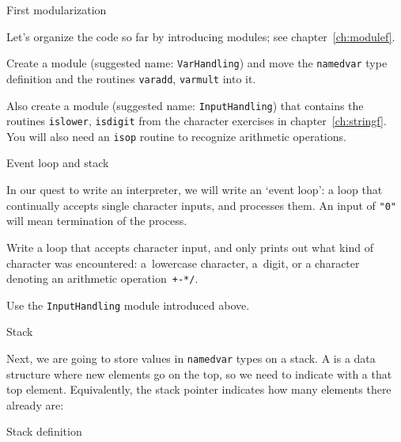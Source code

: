  {First modularization}

Let's organize the code so far by introducing modules;
see chapter~\ref{ch:modulef}.

\begin{exercise}
  \label{ex:f-named-var-mod}
  Create a module (suggested name: \lstinline{VarHandling}) and
  move the \lstinline{namedvar} type definition and
  the routines \lstinline{varadd}, \lstinline{varmult}
  into it.
\end{exercise}

\begin{exercise}
  \label{ex:f-char-mod}
  Also create a module (suggested name: \lstinline{InputHandling})
  that contains
  the routines \lstinline{islower}, \lstinline{isdigit}
  from the character exercises in chapter~\ref{ch:stringf}.
  You will also need an \lstinline{isop} routine to recognize
  arithmetic operations.
\end{exercise}

 {Event loop and stack}

In our quest to write an interpreter, we will write an
`event loop': a loop that continually accepts single character inputs,
and processes them.
An input of \lstinline{"0"} will mean termination of the process.

\begin{exercise}
  \label{ex:f-var-event-loop}
  Write a loop that accepts character input,
  and only prints out what kind of character was encountered:
  a~lowercase character, a~digit, or a character denoting
  an arithmetic operation~\lstinline|+-*/|.


  Use the \lstinline{InputHandling} module introduced above.
\end{exercise}

 {Stack}

Next, we are going to  store values in \lstinline{namedvar} types on a stack.
A  is a data structure where new elements go on the top,
so we need to indicate with a 
that top element.
Equivalently, the stack pointer indicates how many elements there already are:

\begin{block}{Stack definition}
  \label{sl:f-var-stack-def}
\end{block}

